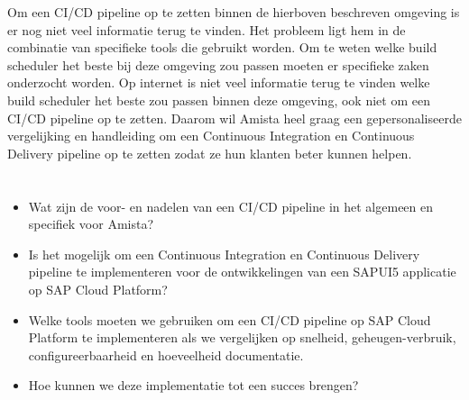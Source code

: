 \newline{}Om een CI/CD pipeline op te zetten binnen de hierboven beschreven omgeving is er nog niet veel informatie terug te vinden. Het probleem ligt hem in de combinatie van specifieke tools die gebruikt worden. Om te weten welke build scheduler het beste bij deze omgeving zou passen moeten er specifieke zaken onderzocht worden. Op internet is niet veel informatie terug te vinden welke build scheduler het beste zou passen binnen deze omgeving, ook niet om een CI/CD pipeline op te zetten. Daarom wil Amista heel graag een gepersonaliseerde vergelijking en handleiding om een Continuous Integration en Continuous Delivery pipeline op te zetten zodat ze hun klanten beter kunnen helpen.


\section{}
\label{sec:onderzoeksvraag}

\begin{itemize}
    \item Wat zijn de voor- en nadelen van een CI/CD pipeline in het algemeen en specifiek voor Amista?
    \item Is het mogelijk om een Continuous Integration en Continuous Delivery pipeline te implementeren voor de ontwikkelingen van een SAPUI5 applicatie op SAP Cloud Platform?
    \item Welke tools moeten we gebruiken om een CI/CD pipeline op SAP Cloud Platform te implementeren als we vergelijken op snelheid, geheugen-verbruik, configureerbaarheid en hoeveelheid documentatie.
    \item Hoe kunnen we deze implementatie tot een succes brengen?
    
\end{itemize}

